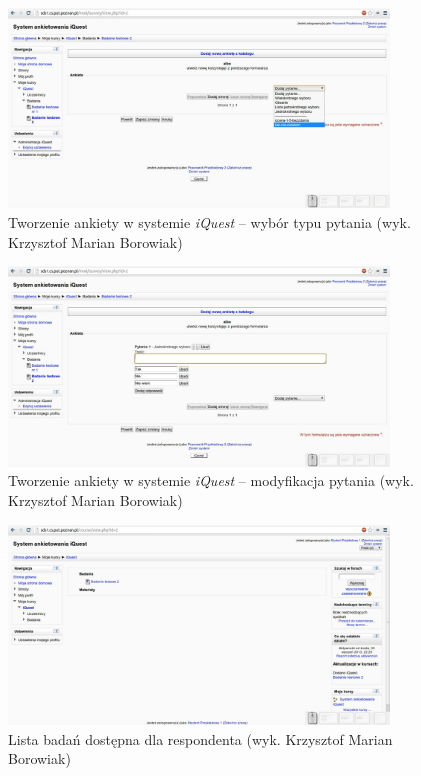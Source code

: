 \begin{figure}[H]
\centering\includegraphics[width=0.9\textwidth]{figures/kb/W2-tworzenieankiety}
\caption{Tworzenie ankiety w systemie \textit{iQuest} -- wybór typu pytania (wyk. Krzysztof Marian Borowiak)}\label{rys:TworzenieAnkiety}
\end{figure}

\begin{figure}[H]
\centering\includegraphics[width=0.9\textwidth]{figures/kb/W2-tworzenieankiety2}
\caption{Tworzenie ankiety w systemie \textit{iQuest} -- modyfikacja pytania (wyk. Krzysztof Marian Borowiak)}\label{rys:TworzenieAnkiety2}
\end{figure}

\begin{figure}[H]
\centering\includegraphics[width=0.9\textwidth]{figures/kb/W2-wyborbadania}
\caption{Lista badań dostępna dla respondenta (wyk. Krzysztof Marian Borowiak)}\label{rys:WyborBadania}
\end{figure}

